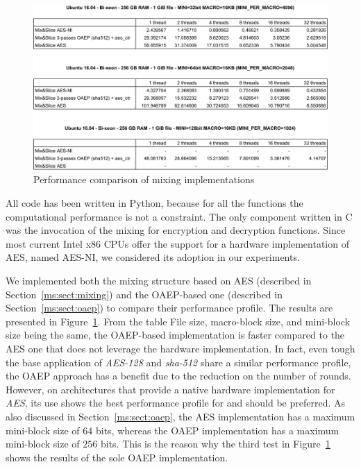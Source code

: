 \begin{figure}
\centering
\includegraphics[width=\columnwidth,valign=t]{figures/oaep}
\caption{\label{ms:table:oaep}Performance comparison of mixing implementations}
\end{figure}

All code has been written in Python, because for all the functions the computational performance is not a constraint. The only component written in C was the invocation of the mixing for encryption and decryption functions. Since most current Intel x86 CPUs offer the support for a hardware implementation of AES, named AES-NI, we considered its adoption in our experiments. 

We implemented both the mixing structure based on AES (described in Section~\ref{ms:sect:mixing}) and the OAEP-based one (described in Section~\ref{ms:sect:oaep}) to compare their performance profile. The results are presented in Figure~\ref{ms:table:oaep}.
From the table File size, macro-block size, and mini-block size being the same, the OAEP-based implementation is faster compared to the AES one that does not leverage the hardware implementation. In fact, even tough the base application of {\em AES-128} and {\em sha-512} share a similar performance profile, the OAEP approach has a benefit due to the reduction on the number of rounds. However, on architectures that provide a native hardware implementation for {\em AES}, its use shows the best performance profile for \name and should be preferred.
As also discussed in Section~\ref{ms:sect:oaep}, the AES implementation has a maximum mini-block size of $64$ bits, whereas the OAEP implementation has a maximum mini-block size of $256$ bits. This is the reason why the third test in Figure~\ref{ms:table:oaep} shows the results of the sole OAEP implementation.


